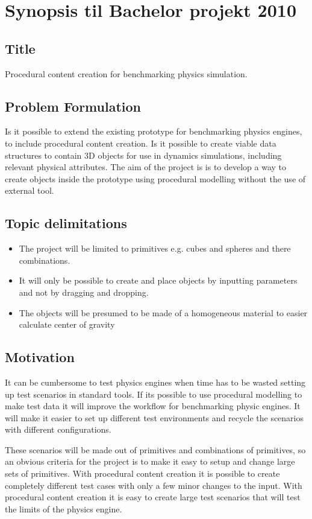 \documentclass[a4paper, 10pt]{article}
\begin{document}
\section*{Synopsis til Bachelor projekt 2010}
\subsection*{Title}
Procedural content creation for benchmarking physics simulation.
\subsection*{Problem Formulation}
Is it possible to extend the existing prototype for benchmarking physics engines, to include procedural content
creation.
Is it possible to create viable data structures to contain 3D objects for use in dynamics simulations, including relevant physical attributes. The aim of the
project is is to develop a way to create objects inside the prototype using procedural modelling without the use of external tool.

\subsection*{Topic delimitations}
\begin{itemize}
	\item The project will be limited to primitives e.g. cubes and spheres and there combinations. 
	\item It will only be possible to create and place objects by inputting parameters and not by dragging and
	dropping.
	\item The objects will be presumed to be made of a homogeneous material to easier calculate center of gravity
\end{itemize}
\subsection*{Motivation}
It can be cumbersome to test physics engines when time has to be wasted
setting up test scenarios in standard tools. If its possible to use procedural modelling to make test data it will
improve the workflow for benchmarking physic engines. It will make it easier to set up different test environments and recycle the scenarios with
different configurations. 

These scenarios will be made out of primitives and combinations of primitives, so an obvious criteria for the project is to make it 
easy to setup and change large sets of primitives.
With procedural content creation it is possible to create completely different test cases with only a few minor changes
to the input. With procedural content creation it is easy to create large test scenarios that will test the limits of the
physics engine. 
\end{document}
